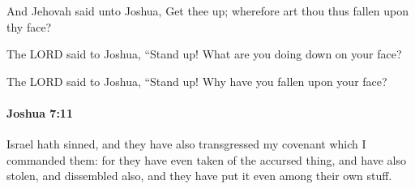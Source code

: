 			\begin{versebox}
					\item[BHS] 
					\item[ASV] And Jehovah said unto Joshua, Get thee up; wherefore art thou thus fallen upon thy face?
					\item[NIV] The LORD said to Joshua, “Stand up! What are you doing down on your face?
					\item[NRSV] The LORD said to Joshua, “Stand up! Why have you fallen upon your face?
			\end{versebox}

		\paragraph{Joshua 7:11} %
			\label{JOSHUA-7-11}

			Israel hath sinned, and they have also transgressed my covenant which I commanded them: for they have even taken of the accursed thing, and have also stolen, and dissembled also, and they have put it even among their own stuff.

